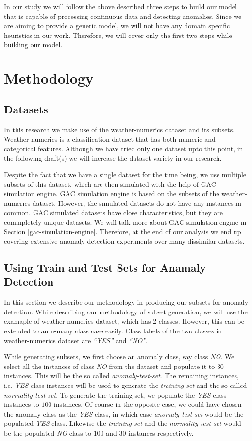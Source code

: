 \documentclass[conference]{IEEEtran}
\begin{document}
In our study we will follow the above described three steps to build our model that is capable of processing continuous data and detecting anomalies.
Since we are aiming to provide a generic model, we will not have any domain specific heuristics in our work.
Therefore, we will cover only the first two steps while building our model.

\section{Methodology}

\subsection{Datasets}

In this research we make use of the weather-numerics dataset and its subsets.
Weather-numerics is a classification dataset that has both numeric and categorical features.
Although we have tried only one dataset upto this point, in the following draft(s) we will increase the dataset variety in our research.

Despite the fact that we have a single dataset for the time being, we use multiple subsets of this dataset, which are then simulated with the help of GAC simulation engine.
GAC simulation engine is based on the subsets of the weather-numerics dataset. 
However, the simulated datasets do not have any instances in common.
GAC simulated datasets have close characteristics, but they are commpletely unique datasets.
We will talk more about GAC simulation engine in Section \ref{gac-simulation-engine}.
Therefore, at the end of our analysis we end up covering extensive anomaly detection experiments over many dissimilar datasets.

\subsection{Using Train and Test Sets for Anamaly Detection}

In this section we describe our methodology in producing our subsets for anomaly detection.
While describing our methodology of subset generation, we will use the examaple of weather-numerics dataset, which has 2 classes.
However, this can be extended to an n-many class case easily.
Class labels of the two classes in weather-numerics dataset are \textit{``YES''} and \textit{``NO''}.

While generating subsets, we first choose an anomaly class, say class \textit{NO}.
We select all the instances of class \textit{NO} from the dataset and populate it to $30$ instances.
This will be the so called \textit{anomaly-test-set}.
The remaining instances, i.e. \textit{YES} class instances will be used to generate the \textit{training set} and the so called \textit{normality-test-set}.
To generate the training set, we populate the \textit{YES} class instances to $100$ instances.
Of course in the opposite case, we could have chosen the anomaly class as the \textit{YES} class, in which case \textit{anomaly-test-set} would be the populated \textit{YES} class.
Likewise the \textit{training-set} and the \textit{normality-test-set} would be the populated \textit{NO} class to $100$ and $30$ instances respectively.
\end{document}
